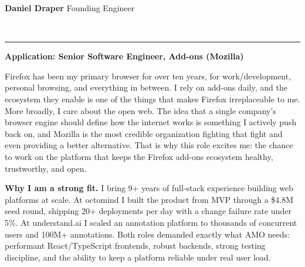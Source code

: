 \documentclass[8pt]{developercv}
\newcommand{\linebreaksmall}{\vspace{2mm}}
\begin{document}
    \begin{minipage}[t]{0.35\textwidth}
        \vspace{-\baselineskip}
        {\Large\textbf{Daniel Draper}} \hspace{0.3cm} {\normalsize Founding Engineer}
    \end{minipage}
    \hfill
    \begin{minipage}[t]{0.62\textwidth}
        \vspace{-\baselineskip}
        \raggedleft
         \hspace{0.2cm}
         \hspace{0.2cm}
        \\[2pt]
    \end{minipage}

    \vspace{0.1cm}
    \noindent\rule{\textwidth}{0.4pt}
    \vspace{0.4cm}

\textbf{Application: Senior Software Engineer, Add-ons (Mozilla)}
\vspace{0.3cm}

Firefox has been my primary browser for over ten years, for work/development, personal browsing, and everything in between.
I rely on add-ons daily, and the ecosystem they enable is one of the things that makes Firefox irreplaceable to me.
More broadly, I care about the open web.
The idea that a single company's browser engine should define how the internet works is something I actively push back on, and Mozilla is the most credible organization fighting that fight and even providing a better alternative.
That is why this role excites me: the chance to work on the platform that keeps the Firefox add-ons ecosystem healthy, trustworthy, and open.

\linebreaksmall

\textbf{Why I am a strong fit.}
I bring 9+ years of full-stack experience building web platforms at scale.
At octomind I built the product from MVP through a \$4.8M seed round, shipping 20+ deployments per day with a change failure rate under 5\%.
At understand.ai I scaled an annotation platform to thousands of concurrent users and 100M+ annotations.
Both roles demanded exactly what AMO needs: performant React/TypeScript frontends, robust backends, strong testing discipline, and the ability to keep a platform reliable under real user load.
\end{document}
